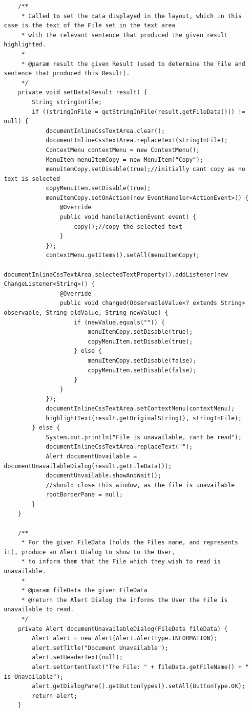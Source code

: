 \begin{lstlisting}
    /**
     * Called to set the data displayed in the layout, which in this case is the text of the File set in the text area
     * with the relevant sentence that produced the given result highlighted.
     *
     * @param result the given Result (used to determine the File and sentence that produced this Result).
     */
    private void setData(Result result) {
        String stringInFile;
        if ((stringInFile = getStringInFile(result.getFileData())) != null) {
            documentInlineCssTextArea.clear();
            documentInlineCssTextArea.replaceText(stringInFile);
            ContextMenu contextMenu = new ContextMenu();
            MenuItem menuItemCopy = new MenuItem("Copy");
            menuItemCopy.setDisable(true);//initially cant copy as no text is selected
            copyMenuItem.setDisable(true);
            menuItemCopy.setOnAction(new EventHandler<ActionEvent>() {
                @Override
                public void handle(ActionEvent event) {
                    copy();//copy the selected text
                }
            });
            contextMenu.getItems().setAll(menuItemCopy);
            documentInlineCssTextArea.selectedTextProperty().addListener(new ChangeListener<String>() {
                @Override
                public void changed(ObservableValue<? extends String> observable, String oldValue, String newValue) {
                    if (newValue.equals("")) {
                        menuItemCopy.setDisable(true);
                        copyMenuItem.setDisable(true);
                    } else {
                        menuItemCopy.setDisable(false);
                        copyMenuItem.setDisable(false);
                    }
                }
            });
            documentInlineCssTextArea.setContextMenu(contextMenu);
            highlightText(result.getOriginalString(), stringInFile);
        } else {
            System.out.println("File is unavailable, cant be read");
            documentInlineCssTextArea.replaceText("");
            Alert documentUnvailable = documentUnavailableDialog(result.getFileData());
            documentUnvailable.showAndWait();
            //should close this window, as the file is unavailable
            rootBorderPane = null;
        }
    }

    /**
     * For the given FileData (holds the Files name, and represents it), produce an Alert Dialog to show to the User,
     * to inform them that the File which they wish to read is unavailable.
     *
     * @param fileData the given FileData
     * @return the Alert Dialog the informs the User the File is unavailable to read.
     */
    private Alert documentUnavailableDialog(FileData fileData) {
        Alert alert = new Alert(Alert.AlertType.INFORMATION);
        alert.setTitle("Document Unavailable");
        alert.setHeaderText(null);
        alert.setContentText("The File: " + fileData.getFileName() + " is Unavailable");
        alert.getDialogPane().getButtonTypes().setAll(ButtonType.OK);
        return alert;
    }


\end{lstlisting}
